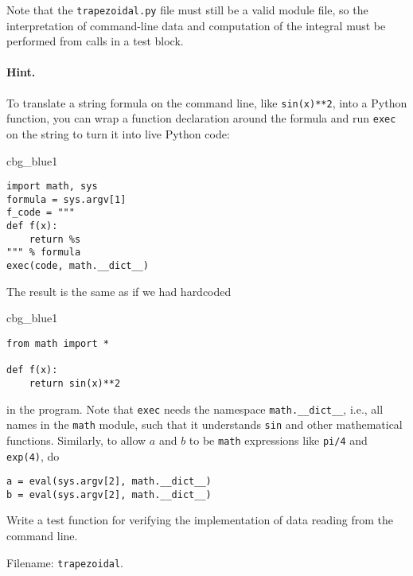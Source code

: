 \documentclass[graybox,sectrefs,envcountresetchap,open=right,final]{svmonodo}
\newenvironment{_cod_tight}[1]{
   \def\FrameCommand{\colorbox{#1}}
   \FrameRule0.6pt\MakeFramed {\FrameRestore}\vskip3mm}
   {\vskip0mm\endMakeFramed}
\newenvironment{cod}[1]{
\bgroup\rmfamily
\fboxsep=0mm\relax
\begin{_cod_tight}{#1}
\list{}{\parsep=-2mm\parskip=0mm\topsep=0pt\leftmargin=2mm
\rightmargin=2\leftmargin\leftmargin=4pt\relax}
\item\relax}
{\endlist\end{_cod_tight}\egroup}
\newenvironment{doconceexercise}{}{}
\begin{document}
\begin{doconceexercise}
Note that the \texttt{trapezoidal.py} file must still be a valid module file, so the
interpretation of command-line data and computation of the integral
must be performed from calls in a test block.


\paragraph{Hint.}
To translate a string formula on the command line, like \texttt{sin(x)**2},
into a Python function, you can wrap a function declaration around
the formula and run \texttt{exec} on the string to turn it into live Python code:

\begin{cod}{cbg_blue1}\begin{Verbatim}[numbers=none,fontsize=\fontsize{9pt}{9pt},baselinestretch=0.95,xleftmargin=2mm]
import math, sys
formula = sys.argv[1]
f_code = """
def f(x):
    return %s
""" % formula
exec(code, math.__dict__)
\end{Verbatim}
\end{cod}
\noindent
The result is the same as if we had hardcoded

\begin{cod}{cbg_blue1}\begin{Verbatim}[numbers=none,fontsize=\fontsize{9pt}{9pt},baselinestretch=0.95,xleftmargin=2mm]
from math import *

def f(x):
    return sin(x)**2
\end{Verbatim}
\end{cod}
\noindent
in the program. Note that \texttt{exec} needs the namespace
\Verb!math.__dict__!, i.e., all names in the \texttt{math} module, such that
it understands \texttt{sin} and other mathematical functions.
Similarly, to allow $a$ and $b$ to be \texttt{math} expressions like \texttt{pi/4}
and \texttt{exp(4)}, do

\begin{Verbatim}[frame=lines,label=\fbox{{\tiny Terminal}},framesep=2.5mm,framerule=0.7pt,fontsize=\fontsize{9pt}{9pt}]
a = eval(sys.argv[2], math.__dict__)
b = eval(sys.argv[2], math.__dict__)
\end{Verbatim}


Write a test function for verifying the implementation of
data reading from the command line.

\noindent Filename: \texttt{trapezoidal}.

\end{doconceexercise}
\end{document}

